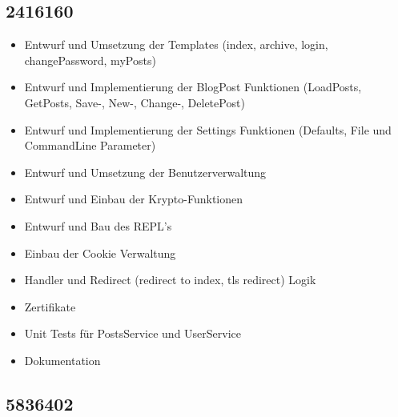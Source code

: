 \documentclass[10pt]{article}
\begin{document}
		\subsection{2416160}
		\begin{itemize}
			\item Entwurf und Umsetzung der Templates (index, archive, login, changePassword, myPosts)
			\item Entwurf und Implementierung der BlogPost Funktionen (LoadPosts, GetPosts, Save-, New-, Change-, DeletePost)
			\item Entwurf und Implementierung der Settings Funktionen (Defaults, File und CommandLine Parameter)
			\item Entwurf und Umsetzung der Benutzerverwaltung
			\item Entwurf und Einbau der Krypto-Funktionen
			\item Entwurf und Bau des REPL's
			\item Einbau der Cookie Verwaltung
			\item Handler und Redirect (redirect to index, tls redirect) Logik
			\item Zertifikate
			\item Unit Tests f\"ur PostsService und UserService
			\item Dokumentation
		\end{itemize}
		\subsection{5836402}
\end{document}
